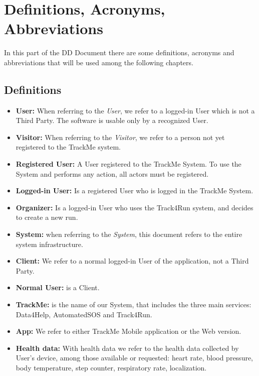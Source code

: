 \section{Definitions, Acronyms, Abbreviations}
In this part of the DD Document there are some definitions, acronyms and abbreviations that will be used among the following chapters.

\subsection{Definitions}
\begin{itemize}

\item \textbf{User:} When referring to the \emph{User}, we refer to a logged-in User which is not a Third Party. The software is usable only by a recognized User. 

\item \textbf{Visitor:} When referring to the \emph{Visitor}, we refer to a person not yet registered to the TrackMe system.

\item \textbf{Registered User:} A User registered to the TrackMe System. To use the System and performs any action, all actors must be registered. 

\item\textbf{Logged-in User:} Is a registered User who is logged in the TrackMe System.

\item\textbf{Organizer:} Is a logged-in User who uses the Track4Run system, and decides to create a new run.

\item \textbf{System:} when referring to the \emph{System}, this document refers to the entire system infrastructure.

\item \textbf{Client:} We refer to a normal logged-in User of the application, not a Third Party.

\item\textbf{Normal User:} is a Client.

\item\textbf{TrackMe:} is the name of our System, that includes the three main services: Data4Help, AutomatedSOS and Track4Run.

\item\textbf{App:} We refer to either TrackMe Mobile application or the Web version.

\item\textbf{Health data:} With health data we refer to the health data collected by User's device, among those available or requested: heart rate, blood pressure, body temperature, step counter, respiratory rate, localization.


\end{itemize}
